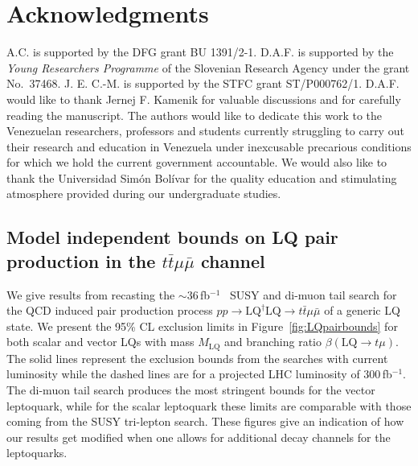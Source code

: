 \documentclass[aps,twocolumn,showpacs,preprintnumbers,amsmath,amssymb,floatfix,nofootinbib]{revtex4-1}
\newcommand{\invfb}{fb$^{-1}$}
\begin{document}
\section*{Acknowledgments}

A.C. is supported by the DFG grant  BU 1391/2-1.  D.A.F. is supported by the {\it Young Researchers Programme} of the Slovenian Research Agency under the grant No.~37468.   J. E. C.-M. is supported by the STFC grant ST/P000762/1. D.A.F. would like to thank Jernej F. Kamenik for valuable discussions and for carefully reading the manuscript. The authors would like to dedicate this work to the Venezuelan researchers, professors and students currently struggling to carry out their research and education in Venezuela under inexcusable precarious conditions for which we hold the current government accountable. We would also like to thank the Universidad Sim\'{o}n Bol\'{i}var for the quality education and stimulating atmosphere provided during our undergraduate studies.


\begin{appendix}  



\section{Model independent bounds on LQ pair production in the $t\bar t\mu\bar\mu$ channel}  \label{appendixA}

We give results from recasting the $\sim 36$\,\invfb~ SUSY and di-muon tail search \cite{Aaboud:2018zeb,Aaboud:2017dmy,Aaboud:2017buh} for the QCD induced pair production process $pp\to \text{LQ}^\dagger \text{LQ} \to t\bar t\mu\bar\mu$ of a generic LQ state. We present the 95\% CL exclusion limits in Figure~\ref{fig:LQpairbounds} for both scalar and vector LQs with mass $M_{\text{LQ}}$ and branching ratio $\beta(\text{LQ}\to t\mu)$.   The solid lines represent the exclusion bounds from the searches with current luminosity while the dashed lines are for a projected LHC luminosity of $300$\,\invfb. The di-muon tail search produces the most stringent bounds for the vector leptoquark, while for the scalar leptoquark these limits are comparable with those coming from the SUSY tri-lepton search.  
These figures give an indication of how our results get modified  when one allows for additional decay channels for the leptoquarks.


\end{appendix} 



\begin{thebibliography}{90
  
\end{thebibliography}
\end{document}
